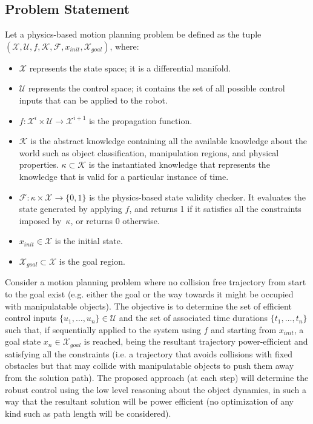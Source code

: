 \documentclass[twocolumn]{svjour3}          %
\begin{document}
\subsection{Problem Statement}
Let a physics-based motion planning problem be defined as the tuple $(\mathcal{X}, \mathcal{U}, f,\mathcal{K}, \mathcal{F}, x_{init}, \mathcal{X}_{goal})$, where:
\begin{itemize}
\item $\mathcal{X}$ represents the state space; it is a differential manifold.
\item $\mathcal{U}$ represents the control space; it contains the set of all possible control inputs that can be applied to the robot.
\item $f:\mathcal{X}^i\times\mathcal{U}\longrightarrow\mathcal{X}^{i+1}$ is the propagation function.
\item $\mathcal{K}$ is the abstract knowledge containing all the available knowledge about the world such as object classification, manipulation regions, and physical properties. $\kappa \subset 
\mathcal{K}$ is the instantiated knowledge that represents the knowledge that is valid for a particular instance of time.
\item $\mathcal{F}:\kappa\times\mathcal{X}\longrightarrow\{0,1\}$ is the physics-based state validity checker. It evaluates the state generated by applying $f$, and returns 1 if it satisfies all the 
constraints imposed by~$\kappa$, or returns 0 otherwise.
\item $x_{init} \in \mathcal{X}$ is the initial state.
\item $\mathcal{X}_{goal} \subset \mathcal{X}$ is the goal region.
\end{itemize}

Consider a motion planning problem where no collision free trajectory from start to the goal exist (e.g. either the goal or the way towards it might be occupied with manipulatable objects). The 
objective is to determine the set of efficient control inputs $\{u_1,\dots,u_n\} \in \mathcal{U}$ and the set of associated time durations $\{t_1,\dots,t_n\}$ such that, if sequentially applied to 
the system using $f$ and starting from $x_{init}$, a goal state $x_n \in \mathcal{X}_{goal}$ is reached, being the resultant trajectory power-efficient and satisfying all the constraints (i.e. a 
trajectory that avoids collisions with fixed obstacles but that may collide with manipulatable objects to push them away from the solution path).
The proposed approach (at each step) will
determine the robust control using the low level reasoning about the object dynamics, in such a way that the resultant solution will be power efficient (no optimization of any kind such as path 
length will be considered).
\end{document}
